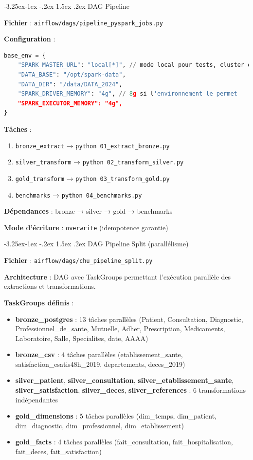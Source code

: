 \documentclass[12pt,a4paper]{article}
\makeatletter
\renewcommand\subsection{\@startsection{subsection}{2}{\z@}%
    {-3.25ex\@plus -1ex \@minus -.2ex}%
    {1.5ex \@plus .2ex}%
    {\normalfont\large\bfseries\color{blue!50!black}}}
\makeatother
\begin{document}
\subsection{DAG Pipeline}

\textbf{Fichier} : \texttt{airflow/dags/pipeline\_pyspark\_jobs.py}

\textbf{Configuration} :
\begin{lstlisting}[language=Python, basicstyle=\small\ttfamily]
base_env = {
    "SPARK_MASTER_URL": "local[*]", // mode local pour tests, cluster en prod
    "DATA_BASE": "/opt/spark-data",
    "DATA_DIR": "/data/DATA_2024",
    "SPARK_DRIVER_MEMORY": "4g", // 8g si l'environnement le permet
    "SPARK_EXECUTOR_MEMORY": "4g",
}
\end{lstlisting}

\textbf{Tâches} :
\begin{enumerate}
\item \texttt{bronze\_extract} → \texttt{python 01\_extract\_bronze.py}
\item \texttt{silver\_transform} → \texttt{python 02\_transform\_silver.py}
\item \texttt{gold\_transform} → \texttt{python 03\_transform\_gold.py}
\item \texttt{benchmarks} → \texttt{python 04\_benchmarks.py}
\end{enumerate}

\textbf{Dépendances} : bronze → silver → gold → benchmarks

\textbf{Mode d'écriture} : \texttt{overwrite} (idempotence garantie)

\subsection{DAG Pipeline Split (parallélisme)}

\textbf{Fichier} : \texttt{airflow/dags/chu\_pipeline\_split.py}

\textbf{Architecture} : DAG avec TaskGroups permettant l'exécution parallèle des extractions et transformations.

\textbf{TaskGroups définis} :
\begin{itemize}
\item \textbf{bronze\_postgres} : 13 tâches parallèles (Patient, Consultation, Diagnostic, Professionnel\_de\_sante, Mutuelle, Adher, Prescription, Medicaments, Laboratoire, Salle, Specialites, date, AAAA)
\item \textbf{bronze\_csv} : 4 tâches parallèles (etablissement\_sante, satisfaction\_esatis48h\_2019, departements, deces\_2019)
\item \textbf{silver\_patient}, \textbf{silver\_consultation}, \textbf{silver\_etablissement\_sante}, \textbf{silver\_satisfaction}, \textbf{silver\_deces}, \textbf{silver\_references} : 6 transformations indépendantes
\item \textbf{gold\_dimensions} : 5 tâches parallèles (dim\_temps, dim\_patient, dim\_diagnostic, dim\_professionnel, dim\_etablissement)
\item \textbf{gold\_facts} : 4 tâches parallèles (fait\_consultation, fait\_hospitalisation, fait\_deces, fait\_satisfaction)
\end{itemize}
\end{document}
